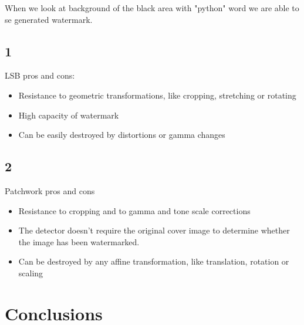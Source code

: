 \documentclass{article}
\begin{document}
	When we look at background of the black area with "python" word we are able to se generated watermark.


	\subsection{1}
	
	LSB pros and cons:
	\begin{itemize}
		
		\item Resistance to geometric transformations, like cropping, stretching or rotating 
		\item High capacity of watermark
		\item Can be easily destroyed by distortions or gamma changes

	
	
	\end{itemize}	
	
	\subsection{2}
	
	Patchwork pros and cons
	
	\begin{itemize}
		\item Resistance to cropping and to gamma and tone scale corrections
		\item The detector doesn’t require the original cover image to determine whether the image has been watermarked.
		\item Can be destroyed by any affine transformation, like translation, rotation or scaling
	\end{itemize}
	
\section{Conclusions}

	
\end{document}
